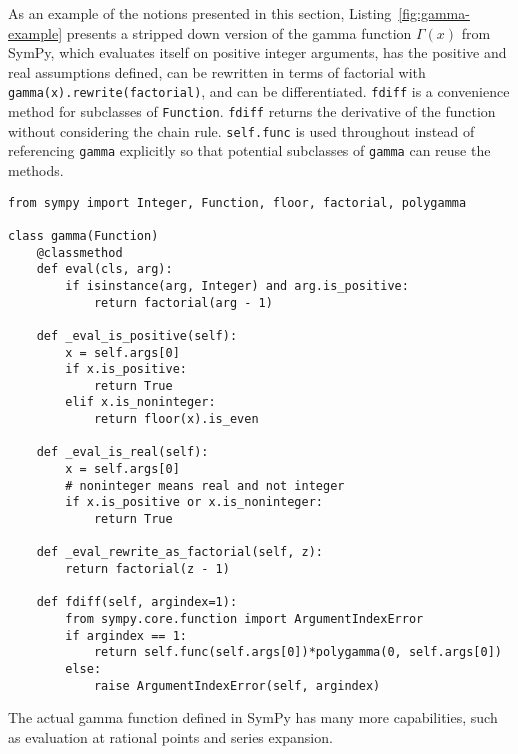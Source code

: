 As an example of the notions presented in this section,
Listing~\ref{fig:gamma-example} presents a stripped down version of the gamma
function $\Gamma(x)$ from SymPy, which evaluates itself on positive integer
arguments, has the positive and real assumptions defined, can be rewritten in
terms of factorial with \verb|gamma(x).rewrite(factorial)|, and can be
differentiated. \texttt{fdiff} is a convenience method for subclasses of
\texttt{Function}. \texttt{fdiff} returns the derivative of the function
without considering the chain rule. \texttt{self.func} is used throughout
instead of referencing \texttt{gamma} explicitly so that potential subclasses
of \texttt{gamma} can reuse the methods.

\lstset{
  basicstyle=\ttfamily,
}

\begin{lstlisting}[caption={A stripped down version of \texttt{sympy.gamma}.},label=fig:gamma-example]
from sympy import Integer, Function, floor, factorial, polygamma

class gamma(Function)
    @classmethod
    def eval(cls, arg):
        if isinstance(arg, Integer) and arg.is_positive:
            return factorial(arg - 1)

    def _eval_is_positive(self):
        x = self.args[0]
        if x.is_positive:
            return True
        elif x.is_noninteger:
            return floor(x).is_even

    def _eval_is_real(self):
        x = self.args[0]
        # noninteger means real and not integer
        if x.is_positive or x.is_noninteger:
            return True

    def _eval_rewrite_as_factorial(self, z):
        return factorial(z - 1)

    def fdiff(self, argindex=1):
        from sympy.core.function import ArgumentIndexError
        if argindex == 1:
            return self.func(self.args[0])*polygamma(0, self.args[0])
        else:
            raise ArgumentIndexError(self, argindex)
\end{lstlisting}
The actual gamma function defined in SymPy has many more capabilities, such as
evaluation at rational points and series expansion.
